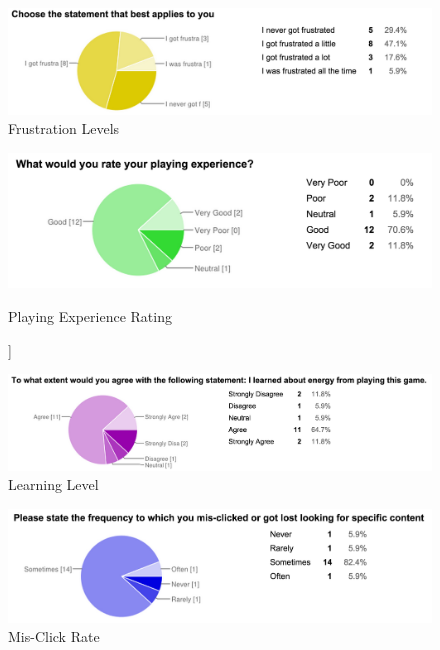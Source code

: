 \documentclass[msc,oneside]{ubcthesis}%
\begin{document}
\begin{figure}[hbt]
  \begin{center}
    \includegraphics[width=1\textwidth]{survey_pics/numeric/frusterated}
    \caption[Frustration Levels]{Frustration Levels}\label{frusterated}
  \end{center}
\end{figure}



\begin{figure}[hbt]
  \begin{center}
    \includegraphics[width=1\textwidth]{survey_pics/numeric/playing_experience}
    \caption[Playing Experice Rating] ]{Playing Experience Rating}\label{playingExperience}
  \end{center}
\end{figure}


\begin{figure}[hbt]
  \begin{center}
    \includegraphics[width=1\textwidth]{survey_pics/numeric/learning}
    \caption[Learning level ]{Learning Level}\label{learning}
  \end{center}
\end{figure}


\begin{figure}[hbt]
  \begin{center}
    \includegraphics[width=1\textwidth]{survey_pics/numeric/mis_clicked}
    \caption[Mis-Click Rate ]{Mis-Click Rate}\label{mis-click}
  \end{center}
\end{figure}
\end{document}
